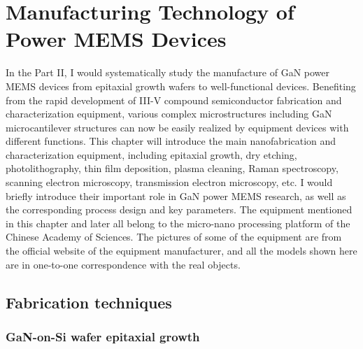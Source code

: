 \chapter{Manufacturing Technology of Power MEMS Devices}
\label{ch:Manufacturing Technology of Power MEMS Devices}

\ifpdf
    \graphicspath{{Chapter6/Figs/Raster/}{Chapter6/Figs/PDF/}{Chapter6/Figs/}}
\else
    \graphicspath{{Chapter6/Figs/Vector/}{Chapter6/Figs/}}
\fi

In the Part II, I would systematically study the manufacture of GaN power MEMS devices from epitaxial growth  wafers  to well-functional devices. Benefiting from the rapid development of III-V compound semiconductor fabrication and characterization equipment, various complex microstructures including GaN microcantilever  structures can now be easily realized by equipment devices with different functions. This chapter will introduce the main nanofabrication and characterization equipment, including epitaxial growth, dry  etching, photolithography, thin  film  deposition, plasma  cleaning, Raman  spectroscopy, scanning electron  microscopy, transmission  electron microscopy, etc. I would briefly introduce their important role in GaN power MEMS  research, as well as the corresponding process  design and key parameters. The equipment mentioned in this chapter and later all belong to the micro-nano processing platform of the Chinese Academy of Sciences. The pictures of some of the equipment are from the official website of the equipment manufacturer, and all the models shown here are in one-to-one correspondence with the real objects.

\section{Fabrication techniques}

\subsection{GaN-on-Si wafer epitaxial growth}


